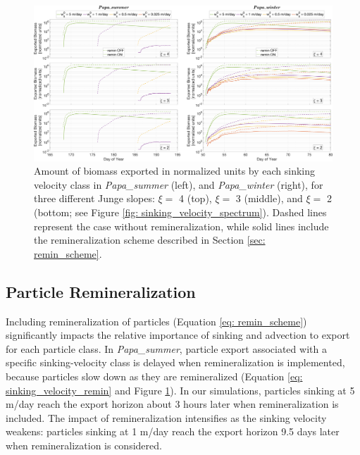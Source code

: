 \documentclass[draft,linenumbers]{agujournal2018}
\begin{document}
 \begin{figure}[ht]
	\centering
	\includegraphics[width = 1\linewidth]{figures/Fig7_biomass_export}
	\caption{Amount of biomass exported in normalized units by each sinking velocity class in \textit{Papa\_summer} (left), and \textit{Papa\_winter} (right), for three different Junge slopes: $\xi =$ 4 (top), $\xi =$ 3 (middle), and $\xi =$ 2 (bottom; see Figure \ref{fig: sinking_velocity_spectrum}). Dashed lines represent the case without remineralization, while solid lines include the remineralization scheme described in Section \ref{sec: remin_scheme}.}
	\label{fig: biomass_export_remin}
\end{figure}

 \subsection{Particle Remineralization}
 \label{sec: results_remin}
 
 Including remineralization of particles (Equation \ref{eq: remin_scheme}) significantly impacts the relative importance of sinking and advection to export for each particle class. In \textit{Papa\_summer}, particle export associated with a specific sinking-velocity class is delayed when remineralization is implemented, because particles slow down as they are remineralized (Equation \ref{eq: sinking_velocity_remin} and Figure \ref{fig: biomass_export_remin}). In our simulations, particles sinking at 5 m/day reach the export horizon about 3 hours later when remineralization is included. The impact of remineralization intensifies as the sinking velocity weakens: particles sinking at 1 m/day reach the export horizon 9.5 days later when remineralization is considered.
 
\end{document}
